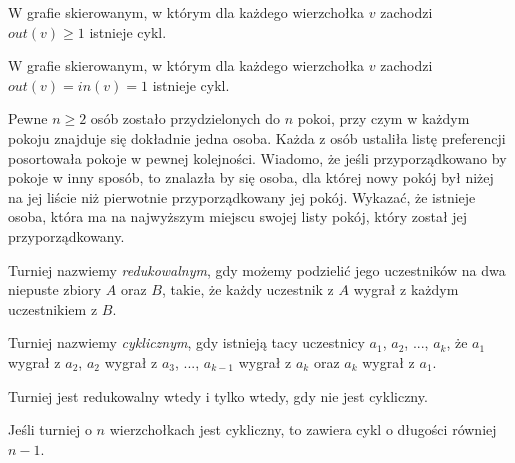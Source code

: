










\noindent
W grafie skierowanym, w którym dla każdego wierzchołka $v$ zachodzi $out(v) \geqslant 1$ istnieje cykl.




\noindent
W grafie skierowanym, w którym dla każdego wierzchołka $v$ zachodzi $out(v) = in(v) = 1$ istnieje cykl.



Pewne $n \geqslant 2$ osób zostało przydzielonych do $n$ pokoi, przy czym w każdym pokoju znajduje się dokładnie jedna osoba. Każda z osób ustaliła listę preferencji posortowała pokoje w pewnej kolejności. Wiadomo, że jeśli przyporządkowano by pokoje w inny sposób, to znalazła by się osoba, dla której nowy pokój był niżej na jej liście niż pierwotnie przyporządkowany jej pokój. Wykazać, że istnieje osoba, która ma na najwyższym miejscu swojej listy pokój, który został jej przyporządkowany.





Turniej nazwiemy \textit{redukowalnym}, gdy możemy podzielić jego uczestników na dwa niepuste zbiory $A$ oraz $B$, takie, że każdy uczestnik z $A$ wygrał z każdym uczestnikiem z $B$.

Turniej nazwiemy \textit{cyklicznym}, gdy istnieją tacy uczestnicy $a_1$, $a_2$, ..., $a_k$, że $a_1$ wygrał z $a_2$, $a_2$ wygrał z $a_3$, ..., $a_{k - 1}$ wygrał z $a_k$ oraz $a_k$ wygrał z $a_1$.




\noindent
Turniej jest redukowalny wtedy i tylko wtedy, gdy nie jest cykliczny.



\noindent
Jeśli turniej o $n$ wierzchołkach jest cykliczny, to zawiera cykl o długości równiej $n - 1$.

